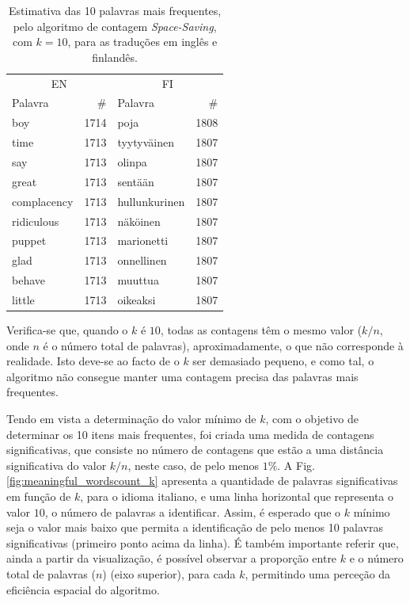 \documentclass[mirror, portugues]{revdetua}
\begin{document}
\begin{table}[H]
\centering
\caption{Estimativa das 10 palavras mais frequentes, pelo algoritmo de contagem \textit{Space-Saving}, com $k = 10$, para as traduções em inglês e finlandês.}
\label{table:top10_ss10}
\begin{tabular}{lr|lr}
\toprule
\multicolumn{2}{c}{EN} & \multicolumn{2}{c}{FI} \\
Palavra & \# & Palavra & \# \\
\midrule
boy & 1714 & poja & 1808 \\
time & 1713 & tyytyväinen & 1807 \\
say & 1713 & olinpa & 1807 \\
great & 1713 & sentään & 1807 \\
complacency & 1713 & hullunkurinen & 1807 \\
ridiculous & 1713 & näköinen & 1807 \\
puppet & 1713 & marionetti & 1807 \\
glad & 1713 & onnellinen & 1807 \\
behave & 1713 & muuttua & 1807 \\
little & 1713 & oikeaksi & 1807 \\
\bottomrule
\end{tabular}
\end{table}

Verifica-se que, quando o $k$ é $10$, todas as contagens têm o mesmo valor ($k/n$, onde $n$ é o número total de palavras), aproximadamente, o que não corresponde à realidade. Isto deve-se ao facto de o $k$ ser demasiado pequeno, e como tal, o algoritmo não consegue manter uma contagem precisa das palavras mais frequentes.

Tendo em vista a determinação do valor mínimo de $k$, com o objetivo de determinar os 10 itens mais frequentes, foi criada uma medida de contagens significativas, que consiste no número de contagens que estão a uma distância significativa do valor $k/n$, neste caso, de pelo menos $1\%$. A Fig. \ref{fig:meaningful_wordscount_k} apresenta a quantidade de palavras significativas em função de $k$, para o idioma italiano, e uma linha horizontal que representa o valor $10$, o número de palavras a identificar. Assim, é esperado que o $k$ mínimo seja o valor mais baixo que permita a identificação de pelo menos 10 palavras significativas (primeiro ponto acima da linha). É também importante referir que, ainda a partir da visualização, é possível observar a proporção entre $k$ e o número total de palavras ($n$) (eixo superior), para cada $k$, permitindo uma perceção da eficiência espacial do algoritmo.
\end{document}
